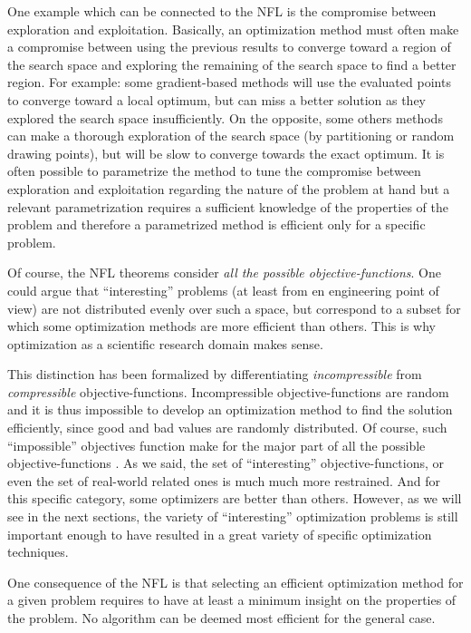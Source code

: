 One example which can be connected to the NFL is the compromise between exploration and exploitation. Basically, an optimization method must often make a compromise between using the previous results to converge toward a region of the search space and exploring the remaining of the search space to find a better region.
For example: some gradient-based methods will use the evaluated points to converge toward a local optimum, but can miss a better solution as they explored the search space insufficiently. On the opposite, some others methods can make a thorough exploration of the search space (by partitioning or random drawing points), but will be slow to converge towards the exact optimum.
It is often possible to parametrize the method to tune the compromise between exploration and exploitation regarding the nature of the problem at hand but a relevant parametrization requires a sufficient knowledge of the properties of the problem and therefore a parametrized method is efficient only for a specific problem.

Of course, the NFL theorems consider \emph{all the possible objective-functions}. One could argue that \enquote{interesting} problems (at least from en engineering point of view) are not distributed evenly over such a space, but correspond to a subset for which some optimization methods are more efficient than others. This is why optimization as a scientific research domain makes sense. 

This distinction has been formalized by differentiating \emph{incompressible} from \emph{compressible} objective-functions. Incompressible objective-functions are random and it is thus impossible to develop an optimization method to find the solution efficiently, since good and bad values are randomly distributed. Of course, such \enquote{impossible} objectives function make for the major part of all the possible objective-functions \cite{English:3-540-45356-3_7}.
As we said, the set of \enquote{interesting} objective-functions, or even the set of real-world related ones is much much more restrained. And for this specific category, some optimizers are better than others. 
However, as we will see in the next sections, the variety of \enquote{interesting} optimization problems is still important enough to have resulted in a great variety of specific optimization techniques.

One consequence of the NFL is that selecting an efficient optimization method for a given problem requires to have at least a minimum insight on the properties of the problem. No algorithm can be deemed most efficient for the general case.

